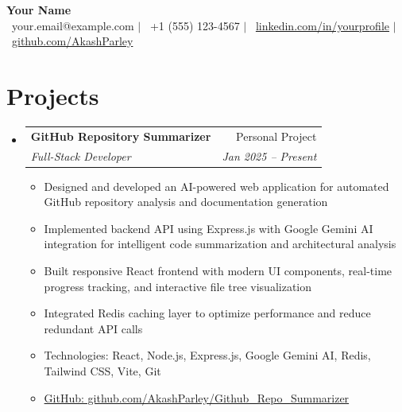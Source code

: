 \documentclass[letterpaper,11pt]{article}
\makeatletter
\newcommand{\resumeItem}[1]{\item\small{#1 \vspace{-2pt}}}
\newcommand{\resumeSubheading}[4]{
    \vspace{-1pt}\item
    \begin{tabular*}{0.97\textwidth}[t]{l@{\extracolsep{\fill}}r}
        \textbf{#1} & #2 \\
        \textit{\small#3} & \textit{\small #4} \\
    \end{tabular*}\vspace{-5pt}
}
\newcommand{\resumeItemListStart}{\begin{itemize}[leftmargin=0.15in, label={}]}
\newcommand{\resumeItemListEnd}{\end{itemize}}
\makeatother
\begin{document}
\begin{center}
    {\Huge \textbf{Your Name}} \\ \vspace{1pt}
    \small \faEnvelope\ your.email@example.com $|$ 
    \faPhone\ +1 (555) 123-4567 $|$ 
    \faLinkedin\ \href{https://linkedin.com/in/yourprofile}{linkedin.com/in/yourprofile} $|$
    \faGithub\ \href{https://github.com/AkashParley}{github.com/AkashParley}
\end{center}

\section{Projects}
\resumeItemListStart
    \resumeSubheading
        {GitHub Repository Summarizer}{Personal Project}
        {Full-Stack Developer}{Jan 2025 -- Present}
        \resumeItemListStart
            \resumeItem{Designed and developed an AI-powered web application for automated GitHub repository analysis and documentation generation}
            \resumeItem{Implemented backend API using Express.js with Google Gemini AI integration for intelligent code summarization and architectural analysis}
            \resumeItem{Built responsive React frontend with modern UI components, real-time progress tracking, and interactive file tree visualization}
            \resumeItem{Integrated Redis caching layer to optimize performance and reduce redundant API calls}
            \resumeItem{Technologies: React, Node.js, Express.js, Google Gemini AI, Redis, Tailwind CSS, Vite, Git}
            \resumeItem{\href{https://github.com/AkashParley/Github_Repo_Summarizer}{GitHub: github.com/AkashParley/Github\_Repo\_Summarizer}}
        \resumeItemListEnd
\resumeItemListEnd

\end{document}
